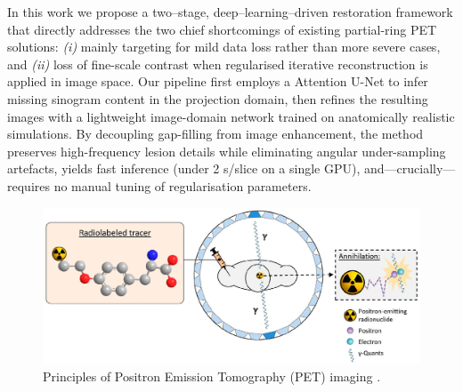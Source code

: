 \documentclass[12pt]{iopart}
\begin{document}
In this work we propose a two–stage, deep–learning–driven restoration framework that directly addresses the two chief shortcomings of existing partial-ring PET solutions: \emph{(i)} mainly targeting for mild data loss rather than more severe cases, and \emph{(ii)} loss of fine-scale contrast when regularised iterative reconstruction is applied in image space.  
Our pipeline first employs a Attention U-Net to infer missing sinogram content in the projection domain, then refines the resulting images with a lightweight image-domain network trained on anatomically realistic simulations. 
By decoupling gap-filling from image enhancement, the method preserves high-frequency lesion details while eliminating angular under-sampling artefacts, yields fast inference (under 2 s/slice on a single GPU), and—crucially—requires no manual tuning of regularisation parameters.  


\begin{figure}[htbp]
	\centering
	\includegraphics[scale=0.70]{./Images/graph.jpg}
	\caption{Principles of Positron Emission Tomography (PET) imaging \cite{Neumaier}.}
	\label{fig:graph}
\end{figure}
\end{document}
